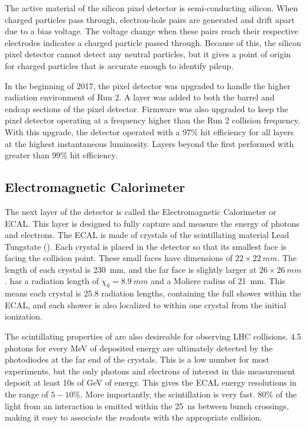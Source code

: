 The active material of the silicon pixel detector is semi-conducting silicon.
When charged particles pass through, electron-hole pairs are generated and drift apart due to a bias voltage.
The voltage change when these pairs reach their respective electrodes indicates a charged particle passed through.
Because of this, the silicon pixel detector cannot detect any neutral particles,
but it gives a point of origin for charged particles that is accurate enough to identify pileup.

In the beginning of 2017, the pixel detector was upgraded to handle the higher radiation environment of Run 2\cite{Dominguez:1481838}.
A layer was added to both the barrel and endcap sections of the pixel detector.
Firmware was also upgraded to keep the pixel detector operating at a frequency higher than the Run 2 collision frequency.
With this upgrade, the detector operated with a 97\% hit efficiency for all layers at the highest instantaneous luminosity.
Layers beyond the first performed with greater than 99\% hit efficiency\cite{Modak:2712284}.

\subsection{Electromagnetic Calorimeter} \label{sec:ecal}

The next layer of the detector is called the Electromagnetic Calorimeter or ECAL.
This layer is designed to fully capture and measure the energy of photons and electrons.
The ECAL is made of crystals of the scintillating material Lead Tungstate ().
Each crystal is placed in the detector so that its smallest face is facing the collision point.
These small faces have dimensions of $22\times\SI{22}{mm}$.
The length of each crystal is \SI{230}{mm},
and the far face is slightly larger at $26\times\SI{26}{mm}$.
 has a radiation length of $\chi_0 = \SI{8.9}{mm}$ and a Moliere radius of \SI{21}{mm}.
This means each crystal is 25.8 radiation lengths, containing the full shower within the ECAL,
and each shower is also localized to within one crystal from the initial ionization.

The scintillating properties of  are also desireable for observing LHC collisions.
4.5 photons for every MeV of deposited energy are ultimately detected by the photodiodes at the far end of the crystals.
This is a low number for most experiments, but the only photons and electrons of interest in this measurement deposit at least 10s of GeV of energy.
This gives the ECAL energy resolutions in the range of $5-10\%$.
More importantly, the scintillation is very fast.
80\% of the light from an interaction is emitted within the \SI{25}{ns} between bunch crossings,
making it easy to associate the readouts with the appropriate collision.

